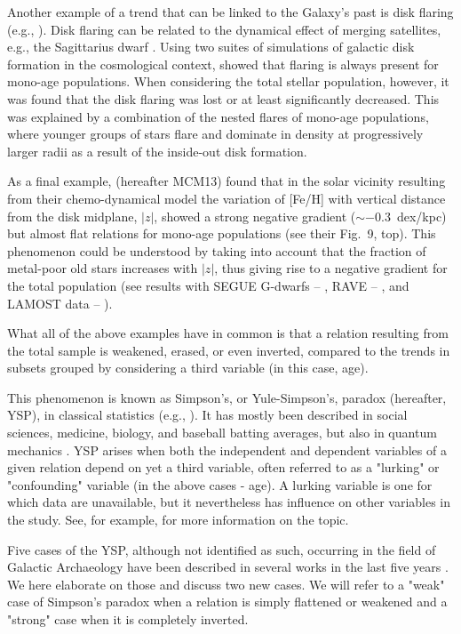 \documentclass[usenatbib]{mnras}
\begin{document}
Another example of a trend that can be linked to the Galaxy's past is disk flaring (e.g., \citealt{kazantzidis08, bovy16, kawata17, wang18, bland-hawthorn16}). Disk flaring can be related to the dynamical effect of merging satellites, e.g., the Sagittarius dwarf \citep{laporte18a, thomas19}. Using two suites of simulations of galactic disk formation in the cosmological context, \cite{minchev15} showed that flaring is always present for mono-age populations. When considering the total stellar population, however, it was found that the disk flaring was lost or at least significantly decreased. This was explained by a combination of the nested flares of mono-age populations, where younger groups of stars flare and dominate in density at progressively larger radii as a result of the inside-out disk formation.

As a final example, \cite{mcm13} (hereafter MCM13) found that in the solar vicinity resulting from their chemo-dynamical model the variation of [Fe/H] with vertical distance from the disk midplane, $|z|$, showed a strong negative gradient ($\sim-0.3$~dex/kpc) but almost flat relations for mono-age populations (see their Fig.~9, top). This phenomenon could be understood by taking into account that the fraction of metal-poor old stars increases with $|z|$, thus giving rise to a negative gradient for the total population (see results with SEGUE G-dwarfs -- \citealt{schlesinger12}, RAVE -- \citealt{boeche13b}, and LAMOST data -- \citealt{wang19}).

What all of the above examples have in common is that a relation resulting from the total sample is weakened, erased, or even inverted, compared to the trends in subsets grouped by considering a third variable (in this case, age).

This phenomenon is known as Simpson's, or Yule-Simpson's, paradox (hereafter, YSP), in classical statistics (e.g., \citealt{yule02, simpson51,smith12, thompson06}). It has mostly been described in social sciences, medicine, biology, and baseball batting averages, but also in quantum mechanics \citep{li13, selvitella17}. YSP arises when both the independent and dependent variables of a given relation depend on yet a third variable, often referred to as a "lurking" or "confounding" variable (in the above cases  - age). A lurking variable is one for which data are unavailable, but it nevertheless has influence on other variables in the study. See, for example, \cite{brase16} for more information on the topic.

Five cases of the YSP, although not identified as such, occurring in the field of Galactic Archaeology have been described in several works in the last five years \citep{mcm13,mcm14,minchev14,minchev15,minchev18}. We here elaborate on those and discuss two new cases. We will refer to a "weak" case of Simpson's paradox when a relation is simply flattened or weakened and a "strong" case when it is completely inverted.
\end{document}
